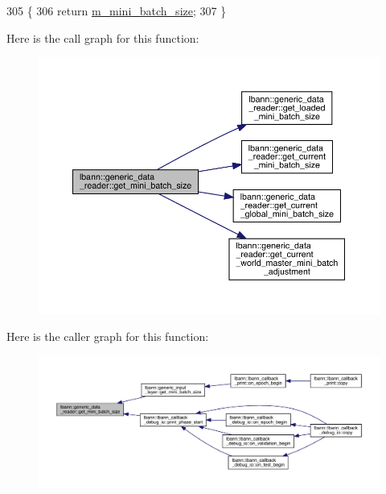 \begin{DoxyCode}
305                                   \{
306     \textcolor{keywordflow}{return} \hyperlink{classlbann_1_1generic__data__reader_a96f87a7d09711ab3eee3940ff2aa36ec}{m\_mini\_batch\_size};
307   \}
\end{DoxyCode}
Here is the call graph for this function\+:\nopagebreak
\begin{figure}[H]
\begin{center}
\leavevmode
\includegraphics[width=350pt]{classlbann_1_1generic__data__reader_af85a5ea421ba6ef7558cdf4bba36fdf0_cgraph}
\end{center}
\end{figure}
Here is the caller graph for this function\+:\nopagebreak
\begin{figure}[H]
\begin{center}
\leavevmode
\includegraphics[width=350pt]{classlbann_1_1generic__data__reader_af85a5ea421ba6ef7558cdf4bba36fdf0_icgraph}
\end{center}
\end{figure}
\mbox{\label{classlbann_1_1generic__data__reader_a192632a8037f6a1eef202747f5916bf3}} 
